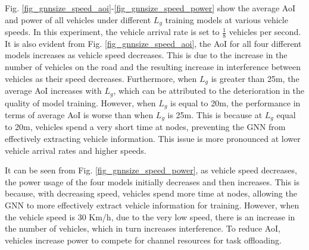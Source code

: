 \documentclass[lettersize,journal,onecolumn]{IEEEtran}
\begin{document}
Fig. \ref{fig_gnnsize_speed_aoi}-\ref{fig_gnnsize_speed_power} show the average AoI and power of all vehicles under different ${{L}_{g}}$ training models at various vehicle speeds. In this experiment, the vehicle arrival rate is set to \(\frac{1}{8}\) vehicles per second. It is also evident from Fig. \ref{fig_gnnsize_speed_aoi}, the AoI for all four different models increases as vehicle speed decreases. This is due to the increase in the number of vehicles on the road and the resulting increase in interference between vehicles as their speed decreases. Furthermore, when ${{L}_{g}}$ is greater than 25m, the average AoI increases with ${{L}_{g}}$, which can be attributed to the deterioration in the quality of model training. However, when ${{L}_{g}}$ is equal to 20m, the performance in terms of average AoI is worse than when ${{L}_{g}}$ is 25m. This is because at ${{L}_{g}}$ equal to 20m, vehicles spend a very short time at nodes, preventing the GNN from effectively extracting vehicle information. This issue is more pronounced at lower vehicle arrival rates and higher speeds.

It can be seen from Fig. \ref{fig_gnnsize_speed_power}, as vehicle speed decreases, the power usage of the four models initially decreases and then increases. This is because, with decreasing speed, vehicles spend more time at nodes, allowing the GNN to more effectively extract vehicle information for training. However, when the vehicle speed is 30 Km/h, due to the very low speed, there is an increase in the number of vehicles, which in turn increases interference. To reduce AoI, vehicles increase power to compete for channel resources for task offloading.
\end{document}
